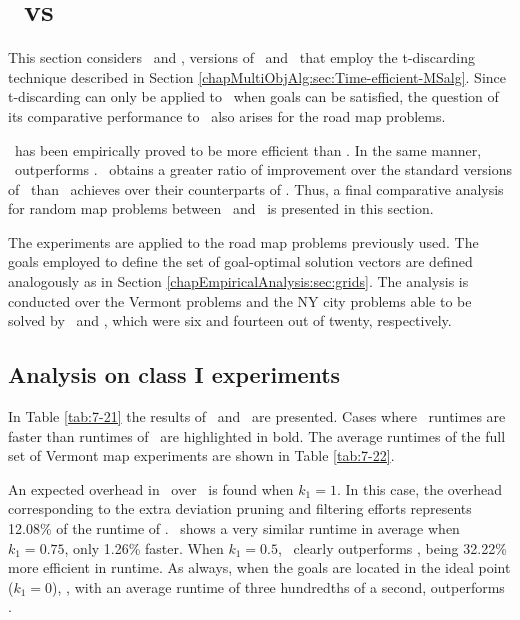 \section{\texorpdfstring{\lexgote}{LEXGO*dr} \ vs \texorpdfstring{\namoate}{NAMOA*dr}}
\label{chapEmpiricalAnalysis:sec:resultsdimacste}

This section considers \namoate \ and \lexgote, versions of \namoa \ and \lexgo \ that employ the t-discarding technique described in Section \ref{chapMultiObjAlg:sec:Time-efficient-MSalg}. Since t-discarding can only be applied to \lexgo \ when goals can be satisfied, the question of its comparative performance to \namoate \ also arises for the road map problems. 

\namoate \ has been empirically proved to be more efficient than \namoa. In the same manner, \lexgote \ outperforms \lexgo. \namoate \ obtains a greater ratio of improvement over the standard versions of \namoa \ than \lexgote \ achieves over their counterparts of \lexgo. Thus, a final comparative analysis for random map problems between \namoate \ and \lexgote \ is presented in this section.  

The experiments are applied to the road map problems previously used. The goals employed to define the set of goal-optimal solution vectors are defined analogously as in Section \ref{chapEmpiricalAnalysis:sec:grids}. The analysis is conducted over the Vermont problems and the NY city problems able to be solved by \lexgote \ and \namoate, which were six and fourteen out of twenty, respectively.

\subsection{Analysis on class I experiments}
\label{chapEmpiricalAnalysis:subsec:analysisdimacstec1}

In Table \ref{tab:7-21} the results of \namoate \ and \lexgote \ are presented. Cases where \lexgote \ runtimes are faster than runtimes of \namoate \ are highlighted in bold. The average runtimes of the full set of Vermont map experiments are shown in Table \ref{tab:7-22}.

An expected overhead in \lexgote \ over \namoate \ is found when $k_1 = 1$. In this case, the overhead corresponding to the extra deviation pruning and filtering efforts represents 12.08\% of the runtime of \namoate. \lexgote \ shows a very similar runtime in average when $k_1 = 0.75$, only 1.26\% faster. When $k_1 = 0.5$, \lexgote \ clearly outperforms \namoate, being 32.22\% more efficient in runtime. As always, when the goals are located in the ideal point ($k_1 = 0$), \lexgote, with an average runtime of three hundredths of a second, outperforms \namoate.


